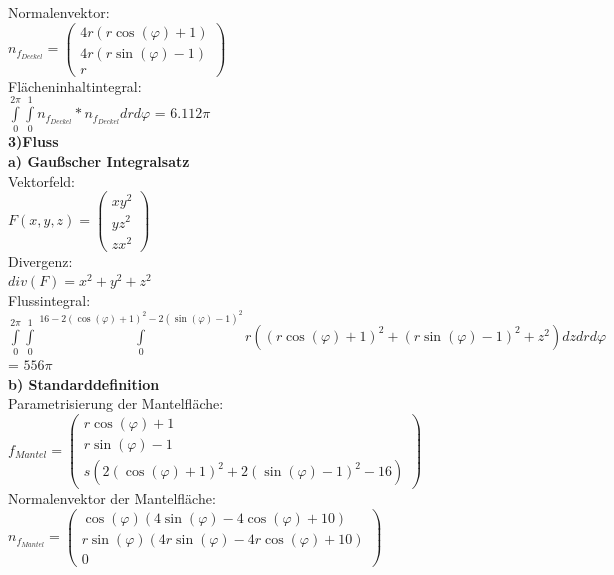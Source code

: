 \documentclass[11pt,final]{scrreprt}
\begin{document}
Normalenvektor:\\
$n_{f_{Deckel}} = \left( \begin{matrix}
4r(r\cos(\varphi)+1)\\4r(r\sin(\varphi)-1)\\r
\end{matrix} \right)$\\

Flächeninhaltintegral:\\
$ \int\limits_{0}^{2\pi} \int\limits_{0}^{1} n_{f_{Deckel}} * n_{f_{Deckel}} drd\varphi $ = $ 6.112\pi $\\

\textbf{3)Fluss}\\

\textbf{a) Gaußscher Integralsatz}\\

Vektorfeld:\\
$F(x, y, z) = \left( \begin{matrix}
xy^2\\yz^2\\zx^2
\end{matrix} \right)$\\

Divergenz:\\
$div(F) = x^2+y^2+z^2$\\

Flussintegral:\\
$\int\limits_{0}^{2\pi}\int\limits_{0}^{1}\int\limits_{0}^{16-2(\cos(\varphi)+1)^2-2(\sin(\varphi)-1)^2} r((r\cos(\varphi)+1)^2+(r\sin(\varphi)-1)^2+z^2) dzdrd\varphi$ = $ 556\pi $\\

\textbf{b) Standarddefinition}\\

Parametrisierung der Mantelfläche:\\

$f_{Mantel} = \left( \begin{matrix}
r\cos(\varphi)+1\\r\sin(\varphi)-1\\s(2(\cos(\varphi)+1)^2+2(\sin(\varphi)-1)^2-16)
\end{matrix} \right)$\\

Normalenvektor der Mantelfläche:\\

$n_{f_{Mantel}}=\left(\begin{matrix}
\cos(\varphi)(4\sin(\varphi) - 4\cos(\varphi) + 10)\\ r\sin(\varphi)(4r\sin(\varphi) - 4r\cos(\varphi) + 10)\\0 \end{matrix}\right) $\\
\end{document}
